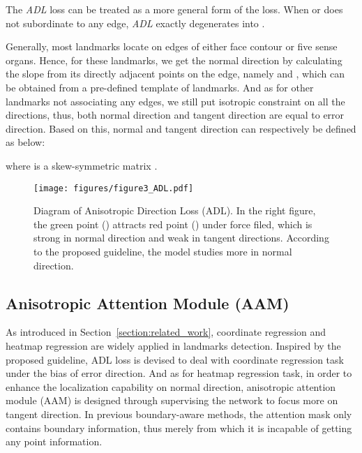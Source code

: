 \documentclass[10pt,twocolumn,letterpaper]{article}
\begin{document}
The \emph{ADL} loss can be treated as a more general form of the \emph{} loss. When \emph{} or \emph{} does not subordinate to any edge, \emph{ADL} exactly degenerates into \emph{}.

Generally, most landmarks locate on edges of either face contour or five sense organs. Hence, for these landmarks, we get the normal direction by calculating the slope from its directly adjacent points on the edge, namely \emph{} and \emph{}, which can be obtained from a pre-defined template of landmarks. And as for other landmarks not associating any edges, we still put isotropic constraint on all the directions, thus, both normal direction and tangent direction are equal to error direction. Based on this, normal and tangent direction can respectively be defined as below:





where  is a skew-symmetric matrix .

\begin{figure}
\begin{center}
\texttt{[image: figures/figure3\_ADL.pdf]}
\end{center}
   \caption{Diagram of Anisotropic Direction Loss (ADL). In the right figure, the green point () attracts red point () under force filed, which is strong in normal direction and weak in tangent directions. According to the proposed guideline, the model studies more in normal direction.}
\label{figure:ADL}
\end{figure}

\subsection{Anisotropic Attention Module (AAM)}

As introduced in Section~\ref{section:related_work}, coordinate regression and heatmap regression are widely applied in landmarks detection. Inspired by the proposed guideline, ADL loss is devised to deal with coordinate regression task under the bias of error direction. And as for heatmap regression task, in order to enhance the localization capability on normal direction, anisotropic attention module (AAM) is designed through supervising the network to focus more on tangent direction. In previous boundary-aware methods, the attention mask only contains boundary information, thus merely from which it is incapable of getting any point information.
\end{document}

